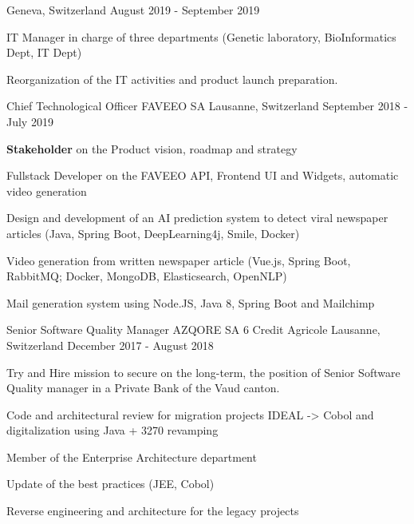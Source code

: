 \begin{cventries}
        {Geneva, Switzerland} %
        {August 2019 - September 2019 } %
        {
            \begin{cvitems} %
                \item{IT Manager in charge of three departments (Genetic laboratory, BioInformatics Dept, IT Dept)}
                \item{Reorganization of the IT activities and product launch preparation.}
            \end{cvitems}
        }
    \cventry
    {Chief Technological Officer} %
    {FAVEEO SA} %
    {Lausanne, Switzerland} %
    {September 2018 - July 2019} %
    {
        \begin{cvitems} %
            \item{\textbf{Stakeholder} on the Product vision, roadmap and strategy}
            \item{Fullstack Developer on the FAVEEO API, Frontend UI and Widgets, automatic video generation}
            \item{Design and development of an AI prediction system to detect viral newspaper articles (Java, Spring Boot, DeepLearning4j, Smile, Docker)}
            \item{Video generation from written newspaper article (Vue.js, Spring Boot, RabbitMQ; Docker, MongoDB, Elasticsearch, OpenNLP)}
            \item{Mail generation system using Node.JS, Java 8, Spring Boot and Mailchimp}
        \end{cvitems}
    }
    \cventry
    {Senior Software Quality Manager} %
    {AZQORE SA 6 Credit Agricole} %
    {Lausanne, Switzerland} %
    {December 2017 - August 2018} %
    {
        \begin{cvitems} %
            \item {Try and Hire mission to secure on the long-term, the position of Senior Software Quality manager in a Private Bank of the Vaud canton.}
            \item {Code and architectural review for migration projects IDEAL -> Cobol and digitalization using Java + 3270 revamping}
            \item{Member of the Enterprise Architecture department}
            \item{Update of the best practices (JEE, Cobol)}
            \item{Reverse engineering and architecture for the legacy projects}

\end{cvitems}}
\end{cventries}
